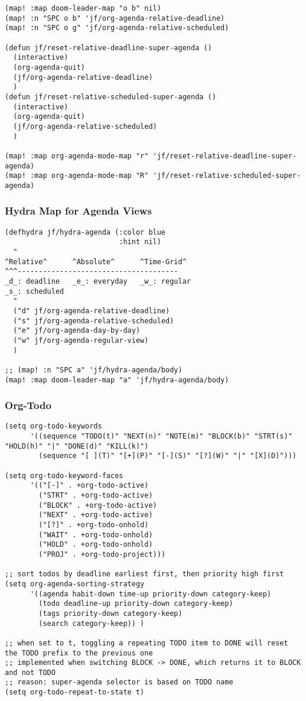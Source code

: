 \documentclass[8pt]{article}
\begin{document}
\begin{verbatim}
(map! :map doom-leader-map "o b" nil)
(map! :n "SPC o b" 'jf/org-agenda-relative-deadline)
(map! :n "SPC o g" 'jf/org-agenda-relative-scheduled)

(defun jf/reset-relative-deadline-super-agenda ()
  (interactive)
  (org-agenda-quit)
  (jf/org-agenda-relative-deadline)
  )
(defun jf/reset-relative-scheduled-super-agenda ()
  (interactive)
  (org-agenda-quit)
  (jf/org-agenda-relative-scheduled)
  )

(map! :map org-agenda-mode-map "r" 'jf/reset-relative-deadline-super-agenda)
(map! :map org-agenda-mode-map "R" 'jf/reset-relative-scheduled-super-agenda)
\end{verbatim}
\subsubsection{Hydra Map for Agenda Views}
\label{sec:orgc6f8338}
\begin{verbatim}
(defhydra jf/hydra-agenda (:color blue
                           :hint nil)
  "
^Relative^      ^Absolute^      ^Time-Grid^
^^^--------------------------------------
_d_: deadline   _e_: everyday   _w_: regular
_s_: scheduled
  "
  ("d" jf/org-agenda-relative-deadline)
  ("s" jf/org-agenda-relative-scheduled)
  ("e" jf/org-agenda-day-by-day)
  ("w" jf/org-agenda-regular-view)
  )

;; (map! :n "SPC a" 'jf/hydra-agenda/body)
(map! :map doom-leader-map "a" 'jf/hydra-agenda/body)
\end{verbatim}
\subsubsection{Org-Todo}
\label{sec:org8f8ed6b}
\begin{verbatim}
(setq org-todo-keywords
      '((sequence "TODO(t)" "NEXT(n)" "NOTE(m)" "BLOCK(b)" "STRT(s)" "HOLD(h)" "|" "DONE(d)" "KILL(k)")
        (sequence "[ ](T)" "[+](P)" "[-](S)" "[?](W)" "|" "[X](D)")))

(setq org-todo-keyword-faces
      '(("[-]" . +org-todo-active)
        ("STRT" . +org-todo-active)
        ("BLOCK" . +org-todo-active)
        ("NEXT" . +org-todo-active)
        ("[?]" . +org-todo-onhold)
        ("WAIT" . +org-todo-onhold)
        ("HOLD" . +org-todo-onhold)
        ("PROJ" . +org-todo-project)))

;; sort todos by deadline earliest first, then priority high first
(setq org-agenda-sorting-strategy
      '((agenda habit-down time-up priority-down category-keep)
        (todo deadline-up priority-down category-keep)
        (tags priority-down category-keep)
        (search category-keep)) )

;; when set to t, toggling a repeating TODO item to DONE will reset the TODO prefix to the previous one
;; implemented when switching BLOCK -> DONE, which returns it to BLOCK and not TODO
;; reason: super-agenda selector is based on TODO name
(setq org-todo-repeat-to-state t)
\end{verbatim}
\end{document}
